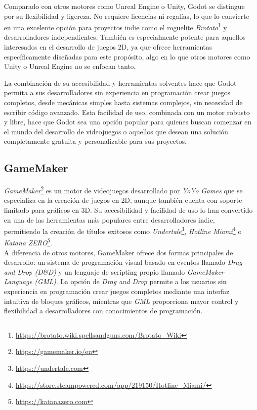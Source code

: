 Comparado con otros motores como Unreal Engine o Unity, Godot se distingue por su flexibilidad y ligereza. No requiere licencias ni regalías, lo que lo convierte en una excelente opción para proyectos indie como el roguelite \textit{Brotato}\footnote{\url{https://brotato.wiki.spellsandguns.com/Brotato_Wiki}} y desarrolladores independientes. También es especialmente potente para aquellos interesados en el desarrollo de juegos 2D, ya que ofrece herramientas específicamente diseñadas para este propósito, algo en lo que otros motores como Unity o Unreal Engine no se enfocan tanto.

La combinación de su accesibilidad y herramientas solventes hace que Godot permita a sus desarrolladores sin experiencia en programación crear juegos completos, desde mecánicas simples hasta sistemas complejos, sin necesidad de escribir código avanzado. Esta facilidad de uso, combinada con un motor robusto y libre, hace que Godot sea una opción popular para quienes buscan comenzar en el mundo del desarrollo de videojuegos o aquellos que desean una solución completamente gratuita y personalizable para sus proyectos.

\subsection{GameMaker}
\textit{GameMaker}\footnote{\url{https://gamemaker.io/en}} es un motor de videojuegos desarrollado por \textit{YoYo Games} que se especializa en la creación de juegos en 2D, aunque también cuenta con soporte limitado para gráficos en 3D. Su accesibilidad y facilidad de uso lo han convertido en una de las herramientas más populares entre desarrolladores indie, permitiendo la creación de títulos exitosos como \textit{Undertale}\footnote{\url{https://undertale.com}}, \textit{Hotline Miami}\footnote{\url{https://store.steampowered.com/app/219150/Hotline_Miami/}} o \textit{Katana ZERO}\footnote{\url{https://katanazero.com}}.\\

A diferencia de otros motores, GameMaker ofrece dos formas principales de desarrollo: un sistema de programación visual basado en eventos llamado \textit{Drag and Drop (D\&D)} y un lenguaje de scripting propio llamado \textit{GameMaker Language (GML)}. La opción de \textit{Drag and Drop} permite a los usuarios sin experiencia en programación crear juegos completos mediante una interfaz intuitiva de bloques gráficos, mientras que \textit{GML} proporciona mayor control y flexibilidad a desarrolladores con conocimientos de programación.\

